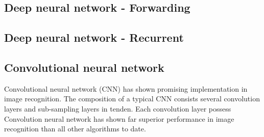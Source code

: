 \subsection{Deep neural network - Forwarding}
\subsection{Deep neural network - Recurrent}
\subsection{Convolutional neural network}
Convolutional neural network (CNN) has shown promising implementation in image recognition. The composition of a typical CNN consists several convolution layers and sub-sampling layers in tenden. Each convolution layer possess
Convolution neural network has shown far superior performance in image recognition than all other algorithms to date.~\cite{Szegedy_2015}